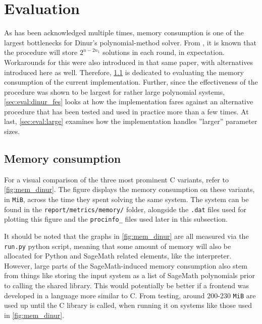 \section{Evaluation} \label{sec:eval}
As has been acknowledged multiple times, memory consumption is one of the largest bottlenecks for Dinur's polynomial-method solver. From \cite{eurocrypt-2021-30841}, it is known that the procedure will store $2^{n - 2n_1}$ solutions in each round, in expectation. Workarounds for this were also introduced in that same paper, with alternatives introduced here as well. Therefore, \cref{sec:eval:mem} is dedicated to evaluating the memory consumption of the current implementation. Further, since the effectiveness of the procedure was shown to be largest for rather large polynomial systems, \cref{sec:eval:dinur_fes} looks at how the implementation fares against an alternative procedure that has been tested and used in practice more than a few times. At last, \cref{sec:eval:large} examines how the implementation handles ''larger'' parameter sizes.

\subsection{Memory consumption} \label{sec:eval:mem}

For a visual comparison of the three most prominent C variants, refer to \cref{fig:mem_dinur}. The figure displays the memory consumption on these variants, in \texttt{MiB}, across the time they spent solving the same system. The system can be found in the \texttt{report/metrics/memory/} folder, alongside the \texttt{.dat} files used for plotting this figure and the \texttt{procinfo\_} files used later in this subsection.

It should be noted that the graphs in \cref{fig:mem_dinur} are all measured via the \texttt{run.py} python script, meaning that some amount of memory will also be allocated for Python and SageMath related elements, like the interpreter. However, large parts of the SageMath-induced memory consumption also stem from things like storing the input system as a list of SageMath polynomials prior to calling the shared library. This would potentially be better if a frontend was developed in a language more similar to C. From testing, around 200-230 \texttt{MiB} are used up until the C library is called, when running it on systems like those used in \cref{fig:mem_dinur}.

